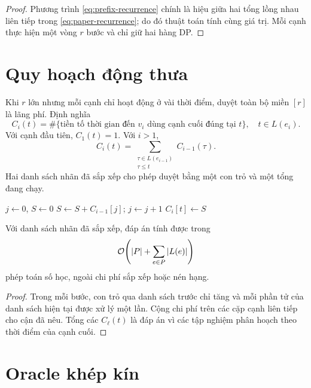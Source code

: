 \begin{proof}
Phương trình \cref{eq:prefix-recurrence} chính là hiệu giữa hai tổng lồng nhau liên tiếp trong \cref{eq:paper-recurrence}; do đó thuật toán tính cùng giá trị. Mỗi cạnh thực hiện một vòng $r$ bước và chỉ giữ hai hàng DP.
\end{proof}

\section{Quy hoạch động thưa}

Khi $r$ lớn nhưng mỗi cạnh chỉ hoạt động ở vài thời điểm, duyệt toàn bộ miền $[r]$ là lãng phí. Định nghĩa
\[
  C_i(t)=\#\{\text{tiền tố thời gian đến }v_i\text{ dùng cạnh cuối đúng tại }t\},
  \quad t\in L(e_i).
\]
Với cạnh đầu tiên, $C_1(t)=1$. Với $i>1$,
\begin{equation}
\label{eq:sparse-recurrence}
  C_i(t)=\sum_{\substack{\tau\in L(e_{i-1})\\\tau\le t}}C_{i-1}(\tau).
\end{equation}
Hai danh sách nhãn đã sắp xếp cho phép duyệt bằng một con trỏ và một tổng đang chạy.

\begin{algorithm}[htbp]
\caption{Một bước chuyển thưa giữa hai cạnh liên tiếp}
\label{alg:forest-sparse}
\begin{algorithmic}[1]
\State $j\gets0$, $S\gets0$
    \State $S\gets S+C_{i-1}[j]$; $j\gets j+1$
  \EndWhile
  \State $C_i[t]\gets S$
\EndFor
\end{algorithmic}
\end{algorithm}

\begin{theorem}
Với danh sách nhãn đã sắp xếp, đáp án tính được trong
\[
  \mathcal{O}\!\left(|P|+\sum_{e\in P}|L(e)|\right)
\]
phép toán số học, ngoài chi phí sắp xếp hoặc nén hạng.
\end{theorem}

\begin{proof}
Trong mỗi bước, con trỏ qua danh sách trước chỉ tăng và mỗi phần tử của danh sách hiện tại được xử lý một lần. Cộng chi phí trên các cặp cạnh liên tiếp cho cận đã nêu. Tổng các $C_\ell(t)$ là đáp án vì các tập nghiệm phân hoạch theo thời điểm của cạnh cuối.
\end{proof}

\section{Oracle khép kín}

